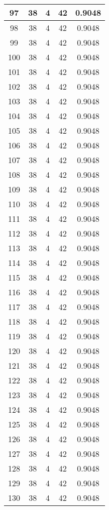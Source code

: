 \documentclass[letterpaper, 12pt]{article}
\begin{document}
\begin{longtable}{|c|c|c|c|c|}
\hline
97 & 38 & 4 & 42 & 0.9048 \\
\hline
98 & 38 & 4 & 42 & 0.9048 \\
\hline
99 & 38 & 4 & 42 & 0.9048 \\
\hline
100 & 38 & 4 & 42 & 0.9048 \\
\hline
101 & 38 & 4 & 42 & 0.9048 \\
\hline
102 & 38 & 4 & 42 & 0.9048 \\
\hline
103 & 38 & 4 & 42 & 0.9048 \\
\hline
104 & 38 & 4 & 42 & 0.9048 \\
\hline
105 & 38 & 4 & 42 & 0.9048 \\
\hline
106 & 38 & 4 & 42 & 0.9048 \\
\hline
107 & 38 & 4 & 42 & 0.9048 \\
\hline
108 & 38 & 4 & 42 & 0.9048 \\
\hline
109 & 38 & 4 & 42 & 0.9048 \\
\hline
110 & 38 & 4 & 42 & 0.9048 \\
\hline
111 & 38 & 4 & 42 & 0.9048 \\
\hline
112 & 38 & 4 & 42 & 0.9048 \\
\hline
113 & 38 & 4 & 42 & 0.9048 \\
\hline
114 & 38 & 4 & 42 & 0.9048 \\
\hline
115 & 38 & 4 & 42 & 0.9048 \\
\hline
116 & 38 & 4 & 42 & 0.9048 \\
\hline
117 & 38 & 4 & 42 & 0.9048 \\
\hline
118 & 38 & 4 & 42 & 0.9048 \\
\hline
119 & 38 & 4 & 42 & 0.9048 \\
\hline
120 & 38 & 4 & 42 & 0.9048 \\
\hline
121 & 38 & 4 & 42 & 0.9048 \\
\hline
122 & 38 & 4 & 42 & 0.9048 \\
\hline
123 & 38 & 4 & 42 & 0.9048 \\
\hline
124 & 38 & 4 & 42 & 0.9048 \\
\hline
125 & 38 & 4 & 42 & 0.9048 \\
\hline
126 & 38 & 4 & 42 & 0.9048 \\
\hline
127 & 38 & 4 & 42 & 0.9048 \\
\hline
128 & 38 & 4 & 42 & 0.9048 \\
\hline
129 & 38 & 4 & 42 & 0.9048 \\
\hline
130 & 38 & 4 & 42 & 0.9048 \\

\end{longtable}
\end{document}
